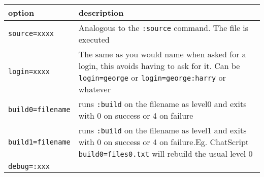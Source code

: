 \documentclass[]{article}
\begin{document}
\begin{longtable}[]{@{}ll@{}}
\toprule
\begin{minipage}[b]{0.18\columnwidth}\raggedright\strut
option\strut
\end{minipage} & \begin{minipage}[b]{0.76\columnwidth}\raggedright\strut
description\strut
\end{minipage}\tabularnewline
\midrule
\endhead
\begin{minipage}[t]{0.18\columnwidth}\raggedright\strut
\texttt{source=xxxx}\strut
\end{minipage} & \begin{minipage}[t]{0.76\columnwidth}\raggedright\strut
Analogous to the \texttt{:source} command. The file is executed\strut
\end{minipage}\tabularnewline
\begin{minipage}[t]{0.18\columnwidth}\raggedright\strut
\texttt{login=xxxx}\strut
\end{minipage} & \begin{minipage}[t]{0.76\columnwidth}\raggedright\strut
The same as you would name when asked for a login, this avoids having to
ask for it. Can be \texttt{login=george} or \texttt{login=george:harry}
or whatever\strut
\end{minipage}\tabularnewline
\begin{minipage}[t]{0.18\columnwidth}\raggedright\strut
\texttt{build0=filename}\strut
\end{minipage} & \begin{minipage}[t]{0.76\columnwidth}\raggedright\strut
runs \texttt{:build} on the filename as level0 and exits with 0 on
success or 4 on failure\strut
\end{minipage}\tabularnewline
\begin{minipage}[t]{0.18\columnwidth}\raggedright\strut
\texttt{build1=filename}\strut
\end{minipage} & \begin{minipage}[t]{0.76\columnwidth}\raggedright\strut
runs \texttt{:build} on the filename as level1 and exits with 0 on
success or 4 on failure.Eg. ChatScript \texttt{build0=files0.txt} will
rebuild the usual level 0\strut
\end{minipage}\tabularnewline
\begin{minipage}[t]{0.18\columnwidth}\raggedright\strut
\texttt{debug=:xxx}\strut
\end{minipage} & \begin{minipage}[t]{0.76\columnwidth}\raggedright\strut

\end{minipage}
\end{longtable}
\end{document}
